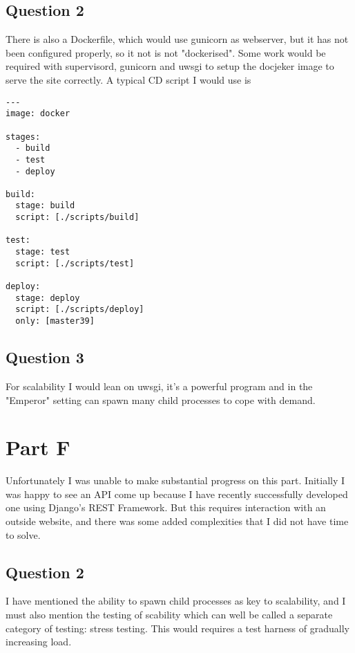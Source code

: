 \documentclass[14pt]{article}
\begin{document}
\subsection*{Question 2}

There is also a Dockerfile, which would use gunicorn as webserver, but it has not been configured properly, so it not is not "dockerised". Some work would be
required with supervisord, gunicorn and uwsgi to setup the docjeker image to serve the site correctly. A typical CD script I would use is

\begin{verbatim}
---
image: docker

stages:
  - build
  - test
  - deploy

build:
  stage: build
  script: [./scripts/build]

test:
  stage: test
  script: [./scripts/test]

deploy:
  stage: deploy
  script: [./scripts/deploy]
  only: [master39]
\end{verbatim}

\subsection*{Question 3}

For scalability I would lean on uwsgi, it's a powerful program and in the "Emperor" setting can spawn many child processes to cope with demand.

\section*{Part F}

Unfortunately I was unable to make substantial progress on this part. Initially I was happy to see an API come up because I have recently successfully developed one using Django's REST Framework. But this requires interaction with an outside website, and there was some added complexities that I did not have time to solve.

\subsection*{Question 2}

I have mentioned the ability to spawn child processes as key to scalability, and I must also mention the testing of scability which can well be called a separate category of testing: stress testing. This would requires a test harness of gradually increasing load.
\end{document}
